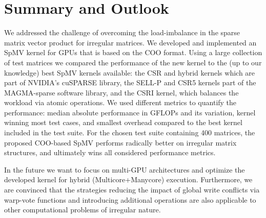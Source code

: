 \section{Summary and Outlook}
\label{s5-conclusion}
We addressed the challenge of overcoming the load-imbalance in the
sparse matrix vector product for irregular matrices.
We developed and implemented an SpMV kernel for GPUs that is based on the COO format.
Using a large collection of test matrices we compared the performance of the new kernel
to the (up to our knowledge) best SpMV kernels available: 
the CSR and hybrid kernels which are part of NVIDIA's cuSPARSE library, the SELL-P and CSR5 kernels
part of the MAGMA-sparse software library, and the CSRI kernel, which balances 
the workload via atomic operations.
We used different metrics to quantify the performance: 
median absolute performance in GFLOPs and its variation,
kernel winning most test cases, and
smallest overhead compared to the best kernel included in the test suite.
For the chosen test suite containing 400 matrices,
the proposed COO-based SpMV performs radically better on irregular matrix
structures, and ultimately wins all considered performance metrics.

In the future we want to focus on multi-GPU architectures
and optimize the developed kernel for hybrid (Multicore+Manycore) execution. 
Furthermore, we are convinced that the strategies reducing the impact of global
write conflicts via warp-vote functions and introducing additional operations
are also applicable to other computational problems of irregular nature.
